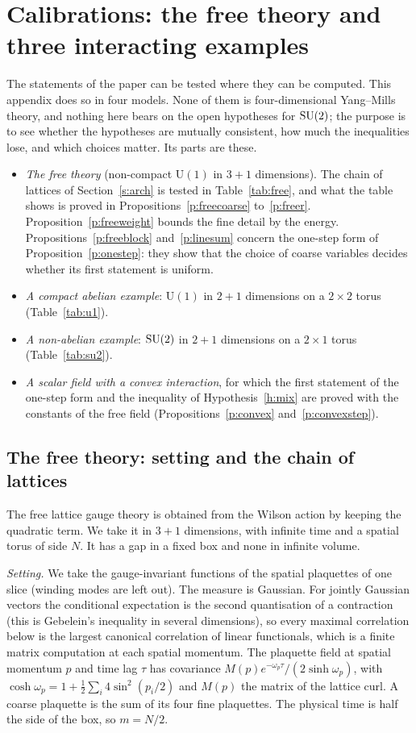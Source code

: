 \section{Calibrations: the free theory and three interacting examples}\label{app:free}
The statements of the paper can be tested where they can be computed. This appendix does so in four models.
None of them is four-dimensional Yang--Mills theory, and nothing here bears on the open hypotheses for
$\mathrm{SU}(2)$; the purpose is to see whether the hypotheses are mutually consistent, how much the inequalities
lose, and which choices matter. Its parts are these.
\begin{itemize}
\item \emph{The free theory} (non-compact $\mathrm U(1)$ in $3+1$ dimensions). The chain of lattices of
Section~\ref{s:arch} is tested in Table~\ref{tab:free}, and what the table shows is proved in
Propositions~\ref{p:freecoarse} to~\ref{p:freer}. Proposition~\ref{p:freeweight} bounds the fine detail by
the energy. Propositions~\ref{p:freeblock} and~\ref{p:linesum} concern the one-step form of
Proposition~\ref{p:onestep}: they show that the choice of coarse variables decides whether its first
statement is uniform.
\item \emph{A compact abelian example}: $\mathrm U(1)$ in $2+1$ dimensions on a $2\times2$ torus
(Table~\ref{tab:u1}).
\item \emph{A non-abelian example}: $\mathrm{SU}(2)$ in $2+1$ dimensions on a $2\times1$ torus
(Table~\ref{tab:su2}).
\item \emph{A scalar field with a convex interaction}, for which the first statement of the one-step form
and the inequality of Hypothesis~\ref{h:mix} are proved with the constants of the free field
(Propositions~\ref{p:convex} and~\ref{p:convexstep}).
\end{itemize}

\subsection*{The free theory: setting and the chain of lattices}
The free lattice gauge theory is obtained from the Wilson action by keeping the quadratic term. We take it
in $3+1$ dimensions, with infinite time and a spatial torus of side $N$. It has a gap in a fixed box and
none in infinite volume.

\emph{Setting.} We take the gauge-invariant functions of the spatial plaquettes of one slice (winding modes
are left out). The measure is Gaussian. For jointly Gaussian vectors the conditional expectation is the
second quantisation of a contraction (this is Gebelein's inequality in several dimensions), so every maximal
correlation below is the largest canonical correlation
of linear functionals, which is a finite matrix computation at each spatial momentum. The plaquette field at
spatial momentum $p$ and time lag $\tau$ has covariance $M(p)e^{-\omega_p\tau}/(2\sinh\omega_p)$, with
$\cosh\omega_p=1+\tfrac12\sum_i4\sin^2(p_i/2)$ and $M(p)$ the matrix of the lattice curl. A coarse plaquette
is the sum of its four fine plaquettes. The physical time is half the side of the box, so $m=N/2$.

